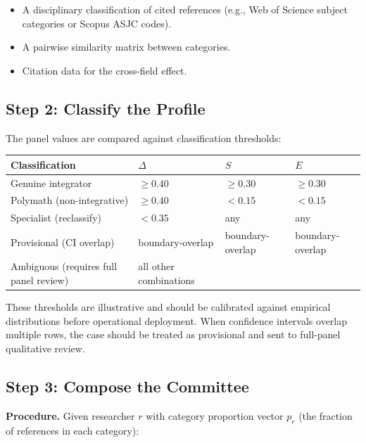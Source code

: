 \documentclass[
]{article}
\providecommand{\tightlist}{%
  \setlength{\itemsep}{0pt}\setlength{\parskip}{0pt}}
\begin{document}
\begin{itemize}
\tightlist
\item
  A disciplinary classification of cited references (e.g., Web of
  Science subject categories or Scopus ASJC codes).
\item
  A pairwise similarity matrix between categories.
\item
  Citation data for the cross-field effect.
\end{itemize}

\hypertarget{step-2-classify-the-profile}{%
\subsection{Step 2: Classify the
Profile}\label{step-2-classify-the-profile}}

The panel values are compared against classification thresholds:

\begin{longtable}[]{@{}llll@{}}
\toprule
Classification & \(\Delta\) & \(S\) & \(E\) \\
\midrule
\endhead
Genuine integrator & \(\geq 0.40\) & \(\geq 0.30\) & \(\geq 0.30\) \\
Polymath (non-integrative) & \(\geq 0.40\) & \(< 0.15\) & \(< 0.15\) \\
Specialist (reclassify) & \(< 0.35\) & any & any \\
Provisional (CI overlap) & boundary-overlap & boundary-overlap &
boundary-overlap \\
Ambiguous (requires full panel review) & all other combinations & & \\
\bottomrule
\end{longtable}

These thresholds are illustrative and should be calibrated against
empirical distributions before operational deployment. When confidence
intervals overlap multiple rows, the case should be treated as
provisional and sent to full-panel qualitative review.

\hypertarget{step-3-compose-the-committee}{%
\subsection{Step 3: Compose the
Committee}\label{step-3-compose-the-committee}}

\textbf{Procedure.} Given researcher \(r\) with category proportion
vector \(p_r\) (the fraction of references in each category):
\end{document}
